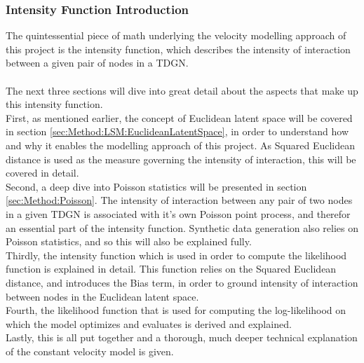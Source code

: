 \subsubsection{Intensity Function Introduction}
\label{sec:Method:VModel:IntensityFuncIntro}
The quintessential piece of math underlying the velocity modelling approach of this project is the intensity function, which describes the intensity of interaction between a given pair of nodes in a TDGN.
\\\\
The next three sections will dive into great detail about the aspects that make up this intensity function.
\\
First, as mentioned earlier, the concept of Euclidean latent space will be covered in section \ref{sec:Method:LSM:EuclideanLatentSpace}, in order to understand how and why it enables the modelling approach of this project. 
As Squared Euclidean distance is used as the measure governing the intensity of interaction, this will be covered in detail.
\\
Second, a deep dive into Poisson statistics will be presented in section \ref{sec:Method:Poisson}.
The intensity of interaction between any pair of two nodes in a given TDGN is associated with it's own Poisson point process, and therefor an essential part of the intensity function.
Synthetic data generation also relies on Poisson statistics, and so this will also be explained fully.
\\
Thirdly, the intensity function which is used in order to compute the likelihood function is explained in detail.
This function relies on the Squared Euclidean distance, and introduces the Bias term, in order to ground intensity of interaction between nodes in the Euclidean latent space.
\\
Fourth, the likelihood function that is used for computing the log-likelihood on which the model optimizes and evaluates is derived and explained.
\\
Lastly, this is all put together and a thorough, much deeper technical explanation of the constant velocity model is given.
